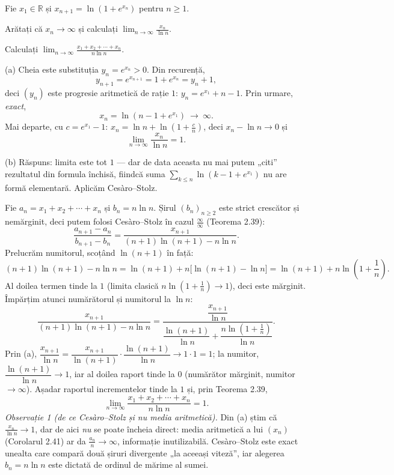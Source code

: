 Fie $x_1\in\mathbb{R}$ și $x_{n+1}=\ln\!\left(1+e^{x_n}\right)$ pentru $n\ge1$.
\begin{parti}
  \item Arătați că $x_n\to\infty$ și calculați $\displaystyle\lim_{n\to\infty}\frac{x_n}{\ln n}$.
  \item Calculați $\displaystyle\lim_{n\to\infty}\frac{x_1+x_2+\cdots+x_n}{n\ln n}$.
\end{parti}
\sol (a) Cheia este substituția $y_n=e^{x_n}>0$. Din recurență,
\[ y_{n+1}=e^{x_{n+1}}=1+e^{x_n}=y_n+1, \]
deci $(y_n)$ este progresie aritmetică de rație $1$: $y_n=e^{x_1}+n-1$. Prin urmare, \emph{exact},
\[ x_n=\ln\!\left(n-1+e^{x_1}\right)\ \longrightarrow\ \infty . \]
Mai departe, cu $c=e^{x_1}-1$: $x_n=\ln n+\ln\!\left(1+\frac cn\right)$, deci $x_n-\ln n\to0$ și
\[ \lim_{n\to\infty}\frac{x_n}{\ln n}=1 . \]

(b) Răspuns: limita este tot $1$ --- dar de data aceasta nu mai putem „citi'' rezultatul din formula închisă, fiindcă suma $\sum_{k\le n}\ln(k-1+e^{x_1})$ nu are formă elementară. Aplicăm Cesàro--Stolz.

Fie $a_n=x_1+x_2+\cdots+x_n$ și $b_n=n\ln n$. Șirul $(b_n)_{n\ge2}$ este strict crescător și nemărginit, deci putem folosi Cesàro--Stolz în cazul $\frac{\infty}{\infty}$ (Teorema 2.39):
\[ \frac{a_{n+1}-a_n}{b_{n+1}-b_n}=\frac{x_{n+1}}{(n+1)\ln(n+1)-n\ln n} . \]
Prelucrăm numitorul, scoțând $\ln(n+1)$ în față:
\[ (n+1)\ln(n+1)-n\ln n=\ln(n+1)+n\bigl[\ln(n+1)-\ln n\bigr]=\ln(n+1)+n\ln\!\left(1+\frac1n\right) . \]
Al doilea termen tinde la $1$ (limita clasică $n\ln(1+\frac1n)\to1$), deci este mărginit. Împărțim atunci numărătorul și numitorul la $\ln n$:
\[ \frac{x_{n+1}}{(n+1)\ln(n+1)-n\ln n}=\frac{\dfrac{x_{n+1}}{\ln n}}{\dfrac{\ln(n+1)}{\ln n}+\dfrac{n\ln\!\left(1+\frac1n\right)}{\ln n}} . \]
Prin (a), $\dfrac{x_{n+1}}{\ln n}=\dfrac{x_{n+1}}{\ln(n+1)}\cdot\dfrac{\ln(n+1)}{\ln n}\to1\cdot1=1$; la numitor, $\dfrac{\ln(n+1)}{\ln n}\to1$, iar al doilea raport tinde la $0$ (numărător mărginit, numitor $\to\infty$). Așadar raportul incrementelor tinde la $1$ și, prin Teorema 2.39,
\[ \lim_{n\to\infty}\frac{x_1+x_2+\cdots+x_n}{n\ln n}=1 . \]
\emph{Observație 1 (de ce Cesàro--Stolz și nu media aritmetică).} Din (a) știm că $\frac{x_n}{\ln n}\to1$, dar de aici \emph{nu} se poate încheia direct: media aritmetică a lui $(x_n)$ (Corolarul 2.41) ar da $\frac{a_n}{n}\to\infty$, informație inutilizabilă. Cesàro--Stolz este exact unealta care compară două șiruri divergente „la aceeași viteză'', iar alegerea $b_n=n\ln n$ este dictată de ordinul de mărime al sumei.

